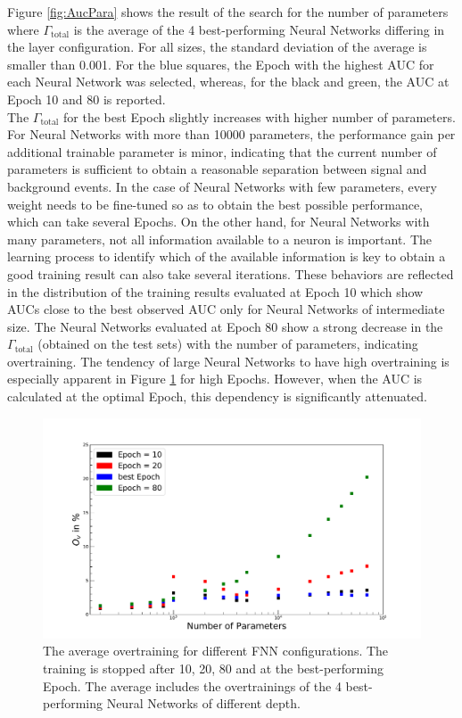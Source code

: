 Figure \ref{fig:AucPara} shows the result of the search for the number of parameters where $\Gamma_{\text{total}}$ is the average of the 4 best-performing Neural Networks differing in the layer configuration. For all sizes, the standard deviation of the average is smaller than 0.001. For the blue squares, the Epoch with the highest AUC for each Neural Network was selected, whereas, for the black and green, the AUC at Epoch 10 and 80 is reported. \\
The $\Gamma_{\text{total}}$ for the best Epoch slightly increases with higher number of parameters. For Neural Networks with more than 10000 parameters, the performance gain per additional trainable parameter is minor, indicating that the current number of parameters is sufficient to obtain a reasonable separation between signal and background events. In the case of Neural Networks with few parameters, every weight needs to be fine-tuned so as to obtain the best possible performance, which can take several Epochs. On the other hand, for Neural Networks with many parameters, not all information available to a neuron is important. The learning process to identify which of the available information is key to obtain a good training result can also take several iterations. These behaviors are reflected in the distribution of the training results evaluated at Epoch 10 which show AUCs close to the best observed AUC only for Neural Networks of intermediate size.
The Neural Networks evaluated at Epoch 80 show a strong decrease in the $\Gamma_{\text{total}}$ (obtained on the test sets) with the number of parameters, indicating overtraining. The tendency of large Neural Networks to have high overtraining is especially apparent in Figure \ref{fig:OvPara} for high Epochs. However, when the AUC is calculated at the optimal Epoch, this dependency is significantly attenuated. \\

\begin{figure}[H]
\centering
\includegraphics[width=\linewidth]{figs/FNN/OvPara_Fixed}
\caption{The average overtraining for different FNN configurations. The training is stopped after 10, 20, 80 and at the best-performing Epoch. The average includes the overtrainings of the 4 best-performing Neural Networks of different depth.}
\label{fig:OvPara}
\end{figure}

